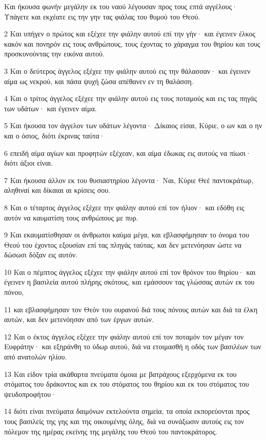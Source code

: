 \par Και ήκουσα φωνήν μεγάλην εκ του ναού λέγουσαν προς τους επτά αγγέλους· Υπάγετε και εκχέατε εις την γην τας φιάλας του θυμού του Θεού.
\par 2 Και υπήγεν ο πρώτος και εξέχεε την φιάλην αυτού επί την γήν· και έγεινεν έλκος κακόν και πονηρόν εις τους ανθρώπους, τους έχοντας το χάραγμα του θηρίου και τους προσκυνούντας την εικόνα αυτού.
\par 3 Και ο δεύτερος άγγελος εξέχεε την φιάλην αυτού εις την θάλασσαν· και έγεινεν αίμα ως νεκρού, και πάσα ψυχή ζώσα απέθανεν εν τη θαλάσση.
\par 4 Και ο τρίτος άγγελος εξέχεε την φιάλην αυτού εις τους ποταμούς και εις τας πηγάς των υδάτων· και έγεινεν αίμα.
\par 5 Και ήκουσα τον άγγελον των υδάτων λέγοντα· Δίκαιος είσαι, Κύριε, ο ων και ο ην και ο όσιος, διότι έκρινας ταύτα·
\par 6 επειδή αίμα αγίων και προφητών εξέχεαν, και αίμα έδωκας εις αυτούς να πίωσι· διότι άξιοι είναι.
\par 7 Και ήκουσα άλλον εκ του θυσιαστηρίου λέγοντα· Ναι, Κύριε Θεέ παντοκράτωρ, αληθιναί και δίκαιαι αι κρίσεις σου.
\par 8 Και ο τέταρτος άγγελος εξέχεε την φιάλην αυτού επί τον ήλιον· και εδόθη εις αυτόν να καυματίση τους ανθρώπους με πυρ.
\par 9 Και εκαυματίσθησαν οι άνθρωποι καύμα μέγα, και εβλασφήμησαν το όνομα του Θεού του έχοντος εξουσίαν επί τας πληγάς ταύτας, και δεν μετενόησαν ώστε να δώσωσι δόξαν εις αυτόν.
\par 10 Και ο πέμπτος άγγελος εξέχεε την φιάλην αυτού επί τον θρόνον του θηρίου· και έγεινεν η βασιλεία αυτού πλήρης σκότους, και εμάσσουν τας γλώσσας αυτών εκ του πόνου,
\par 11 και εβλασφήμησαν τον Θεόν του ουρανού διά τους πόνους αυτών και διά τα έλκη αυτών, και δεν μετενόησαν από των έργων αυτών.
\par 12 Και ο έκτος άγγελος εξέχεε την φιάλην αυτού επί τον ποταμόν τον μέγαν τον Ευφράτην· και εξηράνθη το ύδωρ αυτού, διά να ετοιμασθή η οδός των βασιλέων των από ανατολών ηλίου.
\par 13 Και είδον τρία ακάθαρτα πνεύματα όμοια με βατράχους εξερχόμενα εκ του στόματος του δράκοντος και εκ του στόματος του θηρίου και εκ του στόματος του ψευδοπροφήτου·
\par 14 διότι είναι πνεύματα δαιμόνων εκτελούντα σημεία, τα οποία εκπορεύονται προς τους βασιλείς της γης και της οικουμένης όλης, διά να συνάξωσιν αυτούς εις τον πόλεμον της ημέρας εκείνης της μεγάλης του Θεού του παντοκράτορος.
